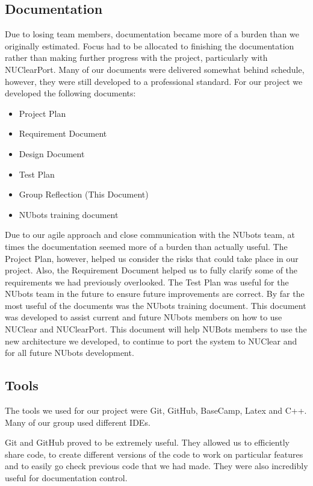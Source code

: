 \documentclass[english,12pt]{scrartcl}
\begin{document}
	\subsection{Documentation}
		Due to losing team members, documentation became more of a burden than we originally estimated.
		Focus had to be allocated to finishing the documentation rather than making further progress with the project, particularly with NUClearPort.
		Many of our documents were delivered somewhat behind schedule, however, they were still developed to a professional standard.
		For our project we developed the following documents:
		\begin{itemize}
			\item Project Plan
			\item Requirement Document
			\item Design Document
			\item Test Plan
			\item Group Reflection (This Document)
			\item NUbots training document
		\end{itemize}
		
		Due to our agile approach and close communication with the NUbots team, at times the documentation seemed more of a burden than actually useful.
		The Project Plan, however, helped us consider the risks that could take place in our project.
		Also, the Requirement Document helped us to fully clarify some of the requirements we had previously overlooked.
		The Test Plan was useful for the NUbots team in the future to ensure future improvements are correct.
		By far the most useful of the documents was the NUbots training document.
		This document was developed to assist current and future NUbots members on how to use NUClear and NUClearPort.
		This document will help NUBots members to use the new architecture we developed, to continue to port the system to NUClear and for all future NUbots development.

	\subsection{Tools}
		The tools we used for our project were Git, GitHub, BaseCamp, Latex and C++.
		Many of our group used different IDEs.

		Git and GitHub proved to be extremely useful.
		They allowed us to efficiently share code, to create different versions of the code to work on particular features and to easily go check previous code that we had made. They were also incredibly useful for documentation control.
\end{document}
